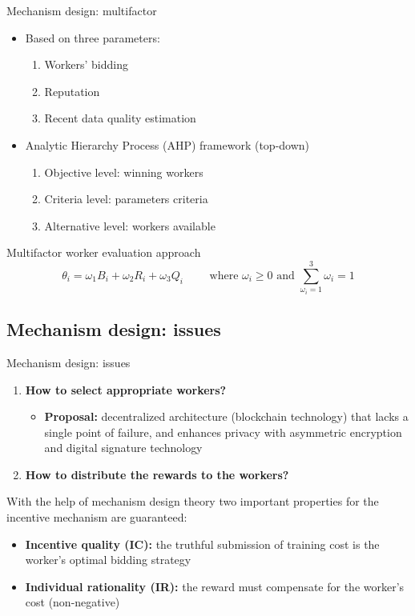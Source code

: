 \begin{frame}{Mechanism design: multifactor}
  \begin{itemize}
    \item Based on three parameters:
          \begin{enumerate}
            \item \alert{Workers' bidding}
            \item \alert{Reputation}
            \item \alert{Recent data quality estimation}
          \end{enumerate}
    \item Analytic Hierarchy Process (AHP) framework \rightarrow (top-down)
    	\begin{enumerate}
            \item \alert{Objective level}: winning workers
            \item \alert{Criteria level}: parameters criteria
            \item \alert{Alternative level}: workers available
          \end{enumerate}
    \end{itemize}
    \begin{exampleblock}{Multifactor worker evaluation approach}
    	\begin{equation*}
      	\theta_{i}=\omega_{1} B_{i}+\omega_{2} R_{i}+\omega_{3} Q_{i} \quad\quad \text { where } \omega_{i} \geq 0 \text { and } \sum_{\omega_{i}=1}^{3} \omega_{i}=1	
    	\end{equation*}
  \end{exampleblock}
\end{frame}

\subsection{Mechanism design: issues}

\begin{frame}{Mechanism design: issues}
  		\begin{enumerate}
   			\item \textbf{How to select appropriate workers?}
   				\begin{itemize}
   					\item \textbf{Proposal: } decentralized architecture (blockchain technology) that lacks a single point of failure, and enhances privacy with asymmetric encryption and digital signature technology
   				\end{itemize}
    		\item \textbf{How to distribute the rewards to the workers?}
  		\end{enumerate}
  		With the help of \alert{mechanism design theory} two important properties for the incentive mechanism are guaranteed:
  		\begin{itemize}
   					\item \textbf{Incentive quality (IC):} the truthful submission of training cost is the worker's optimal bidding strategy
   					\item \textbf{Individual rationality (IR):} the reward must compensate for the worker's cost (non-negative)
   		\end{itemize}
\end{frame}
